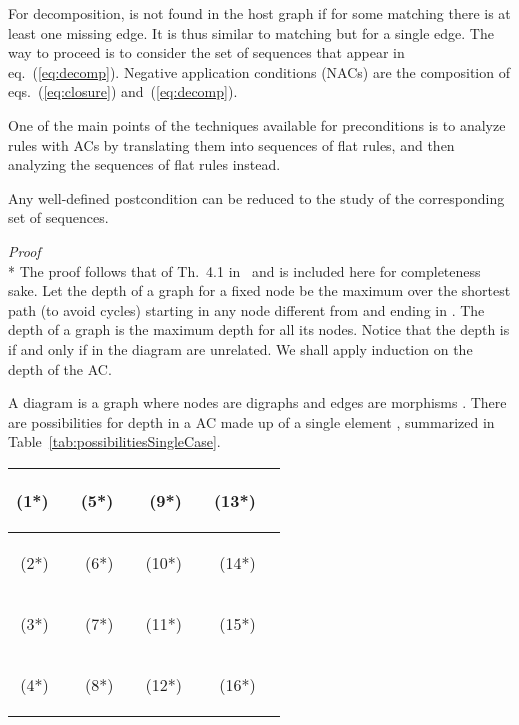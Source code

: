 \documentclass{fundam}
\newcommand{\proofend}{\hfill}
\begin{document}
For decomposition,  is not found in the host graph if for some
matching there is at least one missing edge. It is thus similar to
matching but for a single edge. The way to proceed is to consider the
set of sequences that appear in eq.~(\ref{eq:decomp}). Negative
application conditions (NACs) are the composition of
eqs.~(\ref{eq:closure}) and~(\ref{eq:decomp}). \proofend

One of the main points of the techniques available for preconditions
is to analyze rules with ACs by translating them into sequences of
flat rules, and then analyzing the sequences of flat rules instead.

\begin{theorem}
  \label{th:reductionPost}
  Any well-defined postcondition can be reduced to the study of
  the corresponding set of sequences.
\end{theorem}

\noindent \emph{Proof} \\*
The proof follows that of Th.~4.1 in~\cite{MGGfundamenta} and
is included here for completeness sake. Let the depth of a graph for a
fixed node  be the maximum over the shortest path (to avoid
cycles) starting in any node different from  and ending in
. The depth of a graph is the maximum depth for all its
nodes. Notice that the depth is  if and only if  in
the diagram are unrelated. We shall apply induction on the depth of
the AC.

A diagram  is a graph where nodes are digraphs  and
edges are morphisms . There are  possibilities for depth
 in a AC made up of a single element , summarized in
Table~\ref{tab:possibilitiesSingleCase}.

\begin{table*}[hbtp]
  \centering
  \begin{tabular}{|rl|rl||rl|rl|}
    \hline
    \begin{Large}\phantom{I}\end{Large}(1*) &  & (5*)
    &  & (9*) &  & (13*) & \\
    \hline
    \begin{Large}\phantom{I}\end{Large}(2*) &  & (6*) &  & (10*) &
     & (14*) & \\ 
    \hline
    \begin{Large}\phantom{I}\end{Large}(3*) &  & (7*) &  & (11*) &  & (15*) & \\
    \hline
    \begin{Large}\phantom{I}\end{Large}(4*) &  &
    (8*) &  & (12*) &  & (16*) & \\
    \hline
  \end{tabular}
  \caption{All Possible Diagrams for a Single Element}
  \label{tab:possibilitiesSingleCase}
\end{table*}
\end{document}
